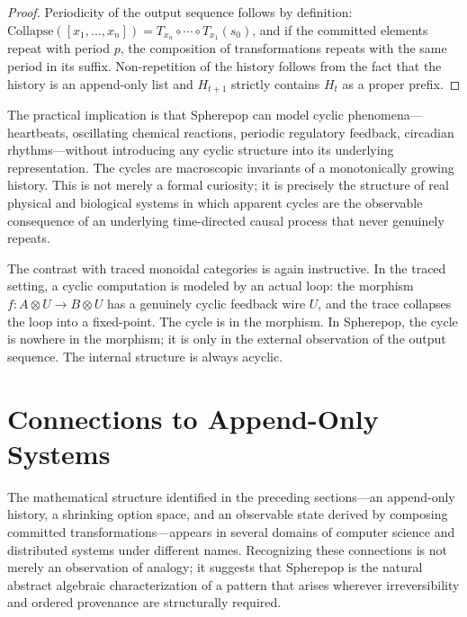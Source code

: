 \documentclass[12pt]{article}
\begin{document}
\begin{proof}
Periodicity of the output sequence follows by definition: $\mathrm{Collapse}([x_1, \ldots, x_n]) = T_{x_n} \circ \cdots \circ T_{x_1}(s_0)$, and if the committed elements repeat with period $p$, the composition of transformations repeats with the same period in its suffix. Non-repetition of the history follows from the fact that the history is an append-only list and $H_{t+1}$ strictly contains $H_t$ as a proper prefix.
\end{proof}

The practical implication is that Spherepop can model cyclic phenomena---heartbeats, oscillating chemical reactions, periodic regulatory feedback, circadian rhythms---without introducing any cyclic structure into its underlying representation. The cycles are macroscopic invariants of a monotonically growing history. This is not merely a formal curiosity; it is precisely the structure of real physical and biological systems in which apparent cycles are the observable consequence of an underlying time-directed causal process that never genuinely repeats.

The contrast with traced monoidal categories is again instructive. In the traced setting, a cyclic computation is modeled by an actual loop: the morphism $f : A \otimes U \to B \otimes U$ has a genuinely cyclic feedback wire $U$, and the trace collapses the loop into a fixed-point. The cycle is in the morphism. In Spherepop, the cycle is nowhere in the morphism; it is only in the external observation of the output sequence. The internal structure is always acyclic.

\section{Connections to Append-Only Systems}
\label{sec:connections}

The mathematical structure identified in the preceding sections---an append-only history, a shrinking option space, and an observable state derived by composing committed transformations---appears in several domains of computer science and distributed systems under different names. Recognizing these connections is not merely an observation of analogy; it suggests that Spherepop is the natural abstract algebraic characterization of a pattern that arises wherever irreversibility and ordered provenance are structurally required.
\end{document}
